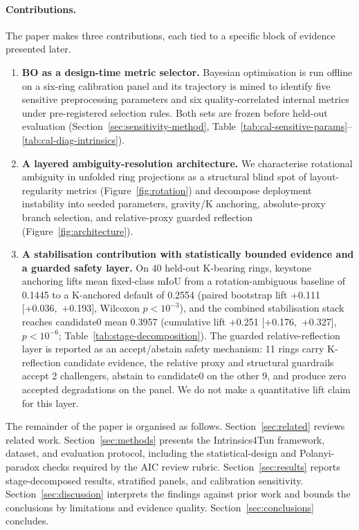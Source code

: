 \documentclass[a4paper,fleqn]{cas-dc}
\begin{document}
\paragraph{Contributions.} The paper makes three contributions, each tied to a specific block of evidence presented later.
\begin{enumerate}
\item \textbf{BO as a design-time metric selector.} Bayesian optimisation is run offline on a six-ring calibration panel and its trajectory is mined to identify five sensitive preprocessing parameters and six quality-correlated internal metrics under pre-registered selection rules. Both sets are frozen before held-out evaluation (Section~\ref{sec:sensitivity-method}, Table~\ref{tab:cal-sensitive-params}--\ref{tab:cal-diag-intrinsics}).
\item \textbf{A layered ambiguity-resolution architecture.} We characterise rotational ambiguity in unfolded ring projections as a structural blind spot of layout-regularity metrics (Figure~\ref{fig:rotation}) and decompose deployment instability into seeded parameters, gravity/K anchoring, absolute-proxy branch selection, and relative-proxy guarded reflection (Figure~\ref{fig:architecture}).
\item \textbf{A stabilisation contribution with statistically bounded evidence and a guarded safety layer.} On 40 held-out K-bearing rings, keystone anchoring lifts mean fixed-class mIoU from a rotation-ambiguous baseline of 0.1445 to a K-anchored default of 0.2554 (paired bootstrap lift +0.111 [+0.036,~+0.193], Wilcoxon $p<10^{-3}$), and the combined stabilisation stack reaches candidate0 mean 0.3957 (cumulative lift +0.251 [+0.176,~+0.327], $p<10^{-6}$; Table~\ref{tab:stage-decomposition}). The guarded relative-reflection layer is reported as an accept/abstain safety mechanism: 11 rings carry K-reflection candidate evidence, the relative proxy and structural guardrails accept 2 challengers, abstain to candidate0 on the other 9, and produce zero accepted degradations on the panel. We do not make a quantitative lift claim for this layer.
\end{enumerate}

The remainder of the paper is organised as follows. Section~\ref{sec:related} reviews related work. Section~\ref{sec:methods} presents the Intrinsics4Tun framework, dataset, and evaluation protocol, including the statistical-design and Polanyi-paradox checks required by the AIC review rubric. Section~\ref{sec:results} reports stage-decomposed results, stratified panels, and calibration sensitivity. Section~\ref{sec:discussion} interprets the findings against prior work and bounds the conclusions by limitations and evidence quality. Section~\ref{sec:conclusions} concludes.
\end{document}
